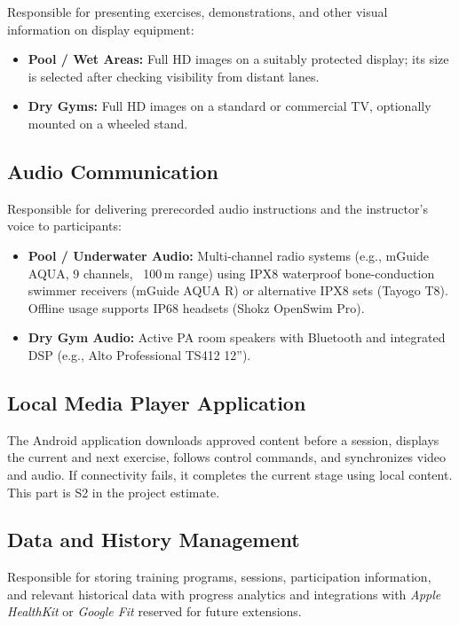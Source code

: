 \documentclass[a4paper,11pt]{article}
\begin{document}
Responsible for presenting exercises, demonstrations, and other visual information on display equipment:
\begin{itemize}
    \item \textbf{Pool / Wet Areas:} Full HD images on a suitably protected display; its size is selected after checking visibility from distant lanes.
    \item \textbf{Dry Gyms:} Full HD images on a standard or commercial TV, optionally mounted on a wheeled stand.
\end{itemize}

\subsection{Audio Communication}

Responsible for delivering prerecorded audio instructions and the instructor's voice to participants:
\begin{itemize}
    \item \textbf{Pool / Underwater Audio:} Multi-channel radio systems (e.g., mGuide AQUA, 9 channels, ~100\,m range) using IPX8 waterproof bone-conduction swimmer receivers (mGuide AQUA R) or alternative IPX8 sets (Tayogo T8). Offline usage supports IP68 headsets (Shokz OpenSwim Pro).
    \item \textbf{Dry Gym Audio:} Active PA room speakers with Bluetooth and integrated DSP (e.g., Alto Professional TS412 12'').
\end{itemize}

\subsection{Local Media Player Application}

The Android application downloads approved content before a session, displays the current and next exercise, follows control commands, and synchronizes video and audio. If connectivity fails, it completes the current stage using local content. This part is S2 in the project estimate.

\subsection{Data and History Management}

Responsible for storing training programs, sessions, participation information, and relevant historical data with progress analytics and integrations with \textit{Apple HealthKit} or \textit{Google Fit} reserved for future extensions.
\end{document}
